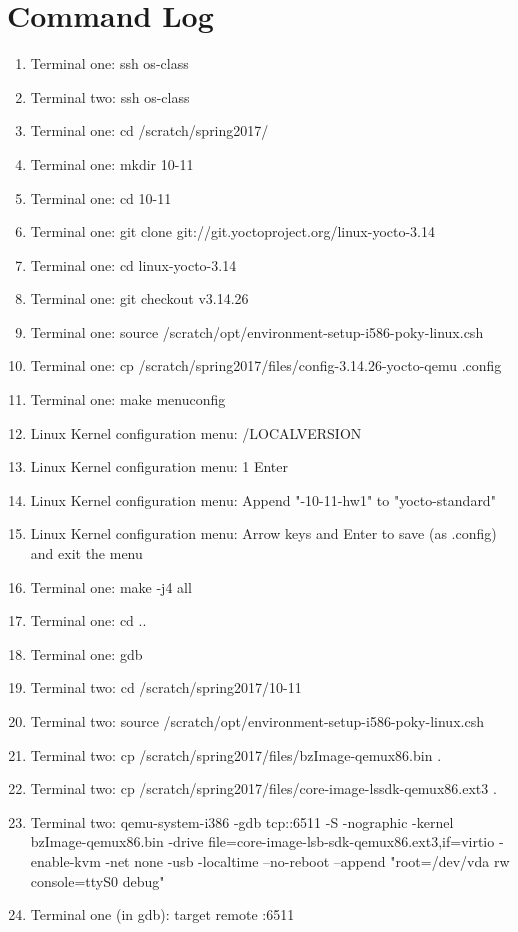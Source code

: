 \documentclass[draftclsnofoot,onecolumn,10pt,compsoc]{IEEEtran}
\begin{document}
\section{Command Log}
\begin{enumerate}
     \item Terminal one: ssh os-class
\item Terminal two: ssh os-class
\item Terminal one: cd /scratch/spring2017/
\item Terminal one: mkdir 10-11
\item Terminal one: cd 10-11
\item Terminal one: git clone git://git.yoctoproject.org/linux-yocto-3.14
\item Terminal one: cd linux-yocto-3.14
\item Terminal one: git checkout v3.14.26
\item Terminal one: source /scratch/opt/environment-setup-i586-poky-linux.csh
\item Terminal one: cp /scratch/spring2017/files/config-3.14.26-yocto-qemu .config
\item Terminal one: make menuconfig
\item Linux Kernel configuration menu: /LOCALVERSION
\item Linux Kernel configuration menu: 1 Enter
\item Linux Kernel configuration menu: Append "-10-11-hw1" to "yocto-standard"
\item Linux Kernel configuration menu: Arrow keys and Enter to save (as .config) and exit the menu
\item Terminal one: make -j4 all
\item Terminal one: cd ..
\item Terminal one: gdb
\item Terminal two: cd /scratch/spring2017/10-11
\item Terminal two: source /scratch/opt/environment-setup-i586-poky-linux.csh
\item Terminal two: cp /scratch/spring2017/files/bzImage-qemux86.bin .
\item Terminal two: cp /scratch/spring2017/files/core-image-lssdk-qemux86.ext3 .
\item Terminal two: qemu-system-i386 -gdb tcp::6511 -S -nographic -kernel bzImage-qemux86.bin -drive file=core-image-lsb-sdk-qemux86.ext3,if=virtio -enable-kvm -net none -usb -localtime --no-reboot --append "root=/dev/vda rw console=ttyS0 debug"
\item Terminal one (in gdb): target remote :6511

\end{enumerate}
\end{document}
